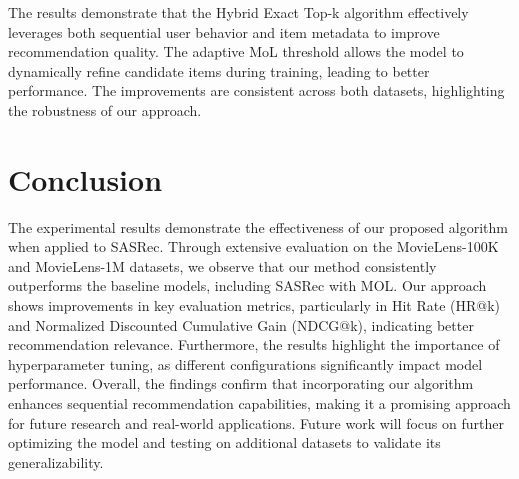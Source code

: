 The results demonstrate that the Hybrid Exact Top-k algorithm effectively leverages both sequential user behavior and item metadata to improve recommendation quality. The adaptive MoL threshold allows the model to dynamically refine candidate items during training, leading to better performance. The improvements are consistent across both datasets, highlighting the robustness of our approach.\\

\section{Conclusion}

The experimental results demonstrate the effectiveness of our proposed algorithm when applied to SASRec. Through extensive evaluation on the MovieLens-100K and MovieLens-1M datasets, we observe that our method consistently outperforms the baseline models, including SASRec with MOL. Our approach shows improvements in key evaluation metrics, particularly in Hit Rate (HR@k) and Normalized Discounted Cumulative Gain (NDCG@k), indicating better recommendation relevance. Furthermore, the results highlight the importance of hyperparameter tuning, as different configurations significantly impact model performance. 
Overall, the findings confirm that incorporating our algorithm enhances sequential recommendation capabilities, making it a promising approach for future research and real-world applications. Future work will focus on further optimizing the model and testing on additional datasets to validate its generalizability.
